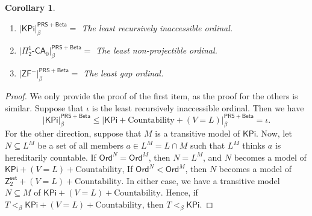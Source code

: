\documentclass{amsart}
\newtheorem{corollary}[corollary]{Corollary}
\theoremstyle{remark}
\newcommand{\PRS}{\mathsf{PRS}}
\newcommand{\Beta}{\mathsf{Beta}}
\newcommand{\KPi}{\mathsf{KPi}}
\newcommand{\set}{\mathsf{set}}
\newcommand{\Ord}{\mathsf{Ord}}
\begin{document}
\begin{corollary}
    \begin{enumerate}
        \item $\lvert \KPi\rvert^{\PRS+\Beta}_\beta = $ The least recursively inaccessible ordinal.
        \item $\lvert\Pi^1_2\text{-}\mathsf{CA}_0\rvert^{\PRS+\Beta}_\beta = $ The least non-projectible ordinal.
        \item $\lvert\mathsf{ZF}^-\rvert^{\PRS+\Beta}_\beta = $ The least gap ordinal.
    \end{enumerate}
\end{corollary}
\begin{proof}
    We only provide the proof of the first item, as the proof for the others is similar.
    Suppose that $\iota$ is the least recursively inaccessible ordinal. Then we have
    \begin{equation*}
        |\KPi|^{\PRS + \mathsf{Beta}}_{\beta} \le |\KPi + \text{Countability} + (V=L)|^{\PRS + \mathsf{Beta}}_{\beta} = \iota.
    \end{equation*}
    For the other direction, suppose that $M$ is a transitive model of $\KPi$. Now, let $N\subseteq L^M$ be a set of all members $a\in L^M = L\cap M$ such that $L^M$ thinks $a$ is hereditarily countable. If $\Ord^N = \Ord^M$, then $N=L^M$, and $N$ becomes a model of $\KPi + (V=L) + \text{Countability}$, If $\Ord^N < \Ord^M$, then $N$ becomes a model of $\mathsf{Z}_2^\set + (V=L) + \text{Countability}$.
    In either case, we have a transitive model $N\subseteq M$ of $\KPi + (V=L) + \text{Countability}$.
    Hence, if $T<_{\beta} \KPi + (V=L) + \text{Countability}$, then $T<_{\beta} \KPi$.
\end{proof}




\end{document}

